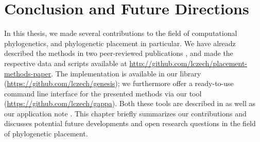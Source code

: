 
\chapter{Conclusion and Future Directions}
\label{ch:ConclusionFutureDirections}







In this thesis, we made several contributions to the field of computational phylogenetics,
and phylogenetic placement in particular.
We have alreadz described the methods in two peer-reviewed publications \cite{Czech2018,Czech2018a},
and made the respective data and scripts available at \url{http://github.com/lczech/placement-methods-paper}.
The implementation is available in our  library (\url{https://github.com/lczech/genesis});
we furthermore offer a ready-to-use command line interface for the presented methods
via our  tool (\url{https://github.com/lczech/gappa}).
Both these tools are described in 
as well as our application note \cite{Czech2019-genesis-gappa}.
This chapter briefly summarizes our contributions and discusses potential future developments
and open research questions in the field of phylogenetic placement.

